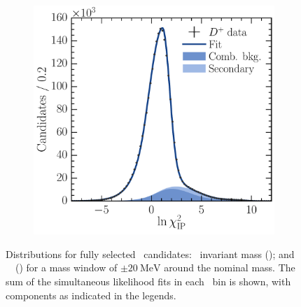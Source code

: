 \begin{figure}
\begin{subfigure}[b]{0.5\textwidth}
    \includegraphics[width=\textwidth]{figures/production/fitting/DpToKpipi_ipchisq_fit_pT_integrated_y_integrated}
    \caption{\lnipchisq}
    \label{fig:prod:fitting:DpToKpipi:ipchisq}
  \end{subfigure}
  \caption{%
    Distributions for fully selected \DpToKpipi\ candidates: \PDplus\ invariant 
    mass (); and \PDplus\ \lnipchisq\ 
    () for a mass window of 
    $\pm\SI{20}{\MeV}$ around the nominal \PDplus mass.
    The sum of the simultaneous likelihood fits in each \pTy\ bin is shown, 
    with components as indicated in the legends.
  }
  \label{fig:prod:fitting:DpToKpipi}
\end{figure}

